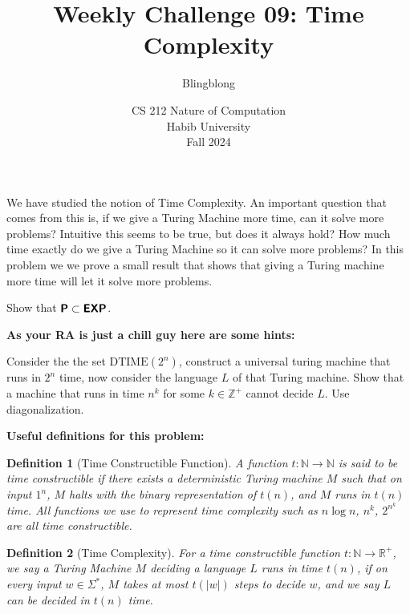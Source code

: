\documentclass[a4paper]{exam}
\title{Weekly Challenge 09: Time Complexity}
\author{Blingblong} %
\date{CS 212 Nature of Computation\\Habib University\\Fall 2024}
\newcommand{\classX}[1]{\ensuremath{\text{\textsf{\textbf{#1}}}}}
\newcommand{\classP}{\classX{P}}
\newcommand{\EXP}{\classX{EXP}}
\newcommand{\Dtime}{\text{DTIME}}
\newtheorem{definition}{Definition}
\begin{document}
\maketitle

\begin{questions}
  
      We have studied the notion of Time Complexity. An important question that comes from this is, if we give a Turing Machine more time, can it solve more problems? Intuitive this seems to be true, but does it always hold? How much time exactly do we give a Turing Machine so it can solve more problems? In this problem we we prove a small result that shows that giving a Turing machine more time will let it solve more problems. 

      \begin{center}
        Show that $\classP \subset \EXP$.
      \end{center}
      \begin{solution}
      \end{solution}

      
      \textbf{As your RA is just a chill guy here are some hints:} 
      
      Consider the the set $\Dtime(2^n)$, construct a universal turing machine that runs in $2^n$ time, now consider the language $L$ of that Turing machine. Show that a machine that runs in time $n^k$ for some $k\in \mathbb{Z}^+$ cannot decide $L$. Use diagonalization.

      \textbf{Useful definitions for this problem:}
      \begin{definition}[Time Constructible Function]
        A function $t: \mathbb{N} \to \mathbb{N}$ is said to be time constructible if there exists a deterministic Turing machine $M$ such that on input $1^n$, $M$ halts with the binary representation of $t(n)$, and $M$ runs in $t(n)$ time. All functions we use to represent time complexity such as $n \log n$, $n^k$, $2^{n^k}$ are all time constructible.
      \end{definition}

      \begin{definition}[Time Complexity]
        For a time constructible function $t: \mathbb{N} \to \mathbb{R}^+$, we say a Turing Machine $M$ deciding a language $L$ runs in time $t(n)$, if on every input $w \in \Sigma^*$, $M$ takes at most $t(|w|)$ steps to decide $w$, and we say $L$ can be decided in $t(n)$ time. 
      \end{definition}


\end{questions}
\end{document}
